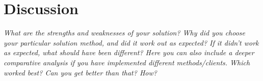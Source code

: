 \section{Discussion}
\label{sec:discussion}

\textit{What are the strengths and weaknesses of your solution? Why did you choose your particular solution method, and did it work out as expected? If it didn’t work as expected, what should have been different? Here you can also include a deeper comparative analysis if you have implemented different methods/clients. Which worked best? Can you get better than that? How?
}